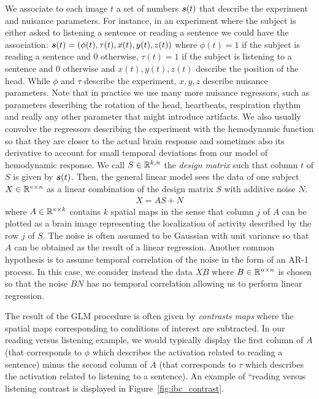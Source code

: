 We associate to each image $t$ a set of numbers $\boldsymbol{s}(t)$ that describe the experiment and
nuisance parameters.
For instance, in an experiment where the subject is either asked to listening a
sentence or reading a sentence we could have the association: $\boldsymbol{s}(t) = (\phi(t), \tau(t), x(t), y(t),
z(t))$ where $\phi(t)=1$ if the subject is reading a sentence and $0$ otherwise, $\tau(t)=1$
if the subject is listening to a sentence and $0$ otherwise and  $x(t), y(t), z(t)$ describe the
position of the head. While $\phi$ and $\tau$ describe the experiment, $x, y, z$
describe nuisance parameters.
Note that in practice we use many more nuisance regressors, such
as parameters describing the rotation of the head, heartbeats, respiration
rhythm and really any other parameter that might introduce artifacts. We also
usually convolve the regressors describing the experiment with the hemodynamic
function so that they are closer to the actual brain response and sometimes also its derivative to account for small temporal deviations from our model of hemodynamic response.
We call $S \in \mathbb{R}^{k, n}$ the \emph{design matrix} such that column
$t$ of $S$ is given by $\boldsymbol{s}(t)$.
Then, the general linear model sees the data of one subject $X \in \mathbb{R}^{v \times n}$ as a linear combination of the
design matrix $S$ with additive noise $N$.
\begin{align}
X = A S + N
\end{align}
where $A \in \mathbb{R}^{v \times k}$ contains $k$ spatial maps in the sense that column $j$
of $A$ can be plotted as a brain image representing the localization of activity
described by the row $j$ of $S$.
The noise is often assumed to be Gaussian with unit variance so that $A$ can be obtained as the
result of a linear regression. Another common hypothesis is to assume temporal
correlation of the noise in the form of an AR-1 process. In this case, we 
consider instead the data $XB$ where $B \in \mathbb{R}^{n \times n}$ is chosen so that the
noise $BN$ has no temporal correlation allowing us to perform linear regression.

The result of the GLM procedure is often given by \emph{contrasts maps} where
the spatial maps corresponding to conditions of interest are subtracted.
In our reading versus listening example, we would typically display the first column of
$A$ (that corresponds to $\phi$ which describes the activation related to
reading a sentence) minus
the second column of $A$ (that corresponds to $\tau$ which describes the
activation related to listening to a sentence). An example of ``reading versus listening contrast is displayed in
Figure~\ref{fig:ibc_contrast}.

